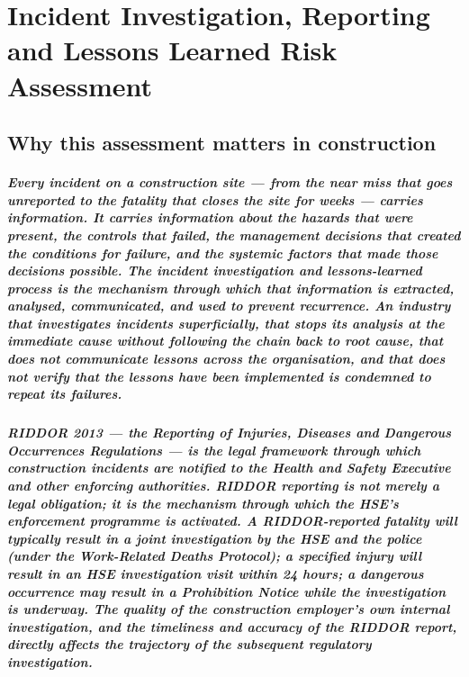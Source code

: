 \chapter{Incident Investigation, Reporting and Lessons Learned Risk Assessment}
\label{chap:Incident Investigation, Reporting and Lessons Learned Risk Assessment}

\section{Why this assessment matters in construction}

\paragraph{Every incident on a construction site --- from the near miss that goes unreported to the fatality that closes the site for weeks --- carries information. It carries information about the hazards that were present, the controls that failed, the management decisions that created the conditions for failure, and the systemic factors that made those decisions possible. The incident investigation and lessons-learned process is the mechanism through which that information is extracted, analysed, communicated, and used to prevent recurrence. An industry that investigates incidents superficially, that stops its analysis at the immediate cause without following the chain back to root cause, that does not communicate lessons across the organisation, and that does not verify that the lessons have been implemented is condemned to repeat its failures.}

\paragraph{RIDDOR 2013 --- the Reporting of Injuries, Diseases and Dangerous Occurrences Regulations --- is the legal framework through which construction incidents are notified to the Health and Safety Executive and other enforcing authorities. RIDDOR reporting is not merely a legal obligation; it is the mechanism through which the HSE's enforcement programme is activated. A RIDDOR-reported fatality will typically result in a joint investigation by the HSE and the police (under the Work-Related Deaths Protocol); a specified injury will result in an HSE investigation visit within 24 hours; a dangerous occurrence may result in a Prohibition Notice while the investigation is underway. The quality of the construction employer's own internal investigation, and the timeliness and accuracy of the RIDDOR report, directly affects the trajectory of the subsequent regulatory investigation.}

